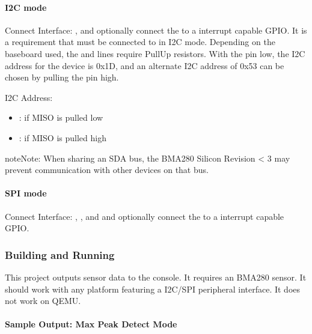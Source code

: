 \documentclass[letterpaper,10pt,english]{sphinxmanual}
\begin{document}
\paragraph{I2C mode}
\label{\detokenize{samples/sensor/bma280/README:i2c-mode}}
Connect Interface: ,  and optionally connect the  to a
interrupt capable GPIO. It is a requirement that  must be connected to
 in I2C mode. Depending on the baseboard used, the  and 
lines require Pull\sphinxhyphen{}Up resistors. With the  pin low, the I2C address for
the device is 0x1D, and an alternate I2C address of 0x53 can be chosen by
pulling the  pin high.

I2C Address:
\begin{itemize}
\item {} 
: if MISO is pulled low

\item {} 
: if MISO is pulled high

\end{itemize}

\begin{sphinxadmonition}{note}{Note:}
When sharing an SDA bus, the BMA280 Silicon Revision \textless{} 3  may prevent
communication with other devices on that bus.
\end{sphinxadmonition}


\paragraph{SPI mode}
\label{\detokenize{samples/sensor/bma280/README:spi-mode}}
Connect Interface: , ,  and  and optionally
connect the  to a interrupt capable GPIO.


\subsubsection{Building and Running}
\label{\detokenize{samples/sensor/bma280/README:building-and-running}}
This project outputs sensor data to the console. It requires an BMA280
sensor. It should work with any platform featuring a I2C/SPI peripheral interface.
It does not work on QEMU.


\paragraph{Sample Output: Max Peak Detect Mode}
\label{\detokenize{samples/sensor/bma280/README:sample-output-max-peak-detect-mode}}
\end{document}

